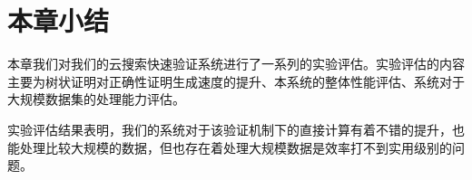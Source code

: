 \section{本章小结}
本章我们对我们的云搜索快速验证系统进行了一系列的实验评估。实验评估的内容主要为树状证明对正确性证明生成速度的提升、本系统的整体性能评估、系统对于大规模数据集的处理能力评估。

实验评估结果表明，我们的系统对于该验证机制下的直接计算有着不错的提升，也能处理比较大规模的数据，但也存在着处理大规模数据是效率打不到实用级别的问题。
